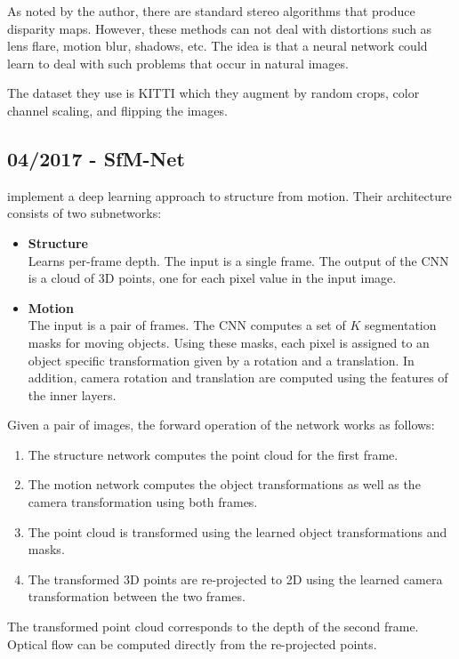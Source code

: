 		As noted by the author, there are standard stereo algorithms that produce disparity maps.
		However, these methods can not deal with distortions such as lens flare, motion blur, shadows, etc.
		The idea is that a neural network could learn to deal with such problems that occur in natural images.
		
		The dataset they use is {KITTI} \cite{Geiger2012KITTI} which they augment by random crops, color channel scaling, and flipping the images.
		
	
	\subsection{04/2017 - SfM-Net}
		
		\cite{SFMNET} implement a deep learning approach to structure from motion. 
		Their architecture consists of two subnetworks:
		\begin{itemize}
			\item \textbf{Structure}
				\\
				Learns per-frame depth.
				The input is a single frame. 
				The output of the CNN is a cloud of 3D points, one for each pixel value in the input image.
			\item \textbf{Motion}
				\\
				The input is a pair of frames.
				The CNN computes a set of $K$ segmentation masks for moving objects. 
				Using these masks, each pixel is assigned to an object specific transformation given by a rotation and a translation.
				In addition, camera rotation and translation are computed using the features of the inner layers.
		\end{itemize}
		Given a pair of images, the forward operation of the network works as follows:
		\begin{enumerate}
			\item The structure network computes the point cloud for the first frame.
			\item The motion network computes the object transformations as well as the camera transformation using both frames.
			\item The point cloud is transformed using the learned object transformations and masks.
			\item The transformed 3D points are re-projected to 2D using the learned camera transformation between the two frames.
		\end{enumerate}
		The transformed point cloud corresponds to the depth of the second frame.
		Optical flow can be computed directly from the re-projected points.
		
